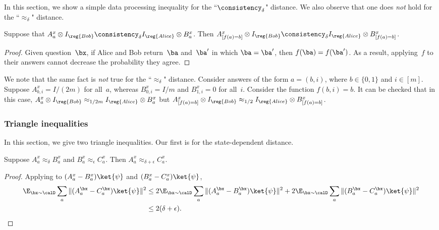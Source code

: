 In this section, we show a simple data processing inequality for the ``$\consistency_\delta$" distance.
We also observe that one does \emph{not} hold for the ``$\approx_\delta$" distance.

\begin{fact}\label{fact:specialize-the-simeq}
Suppose that $A^x_a \otimes I_{\reg{Bob}} \consistency_\delta I_{\reg{Alice}} \otimes B^x_a$.
Then $A^x_{[f(a) = b]} \otimes I_{\reg{Bob}} \consistency_\delta I_{\reg{Alice}} \otimes B^x_{[f(a) = b]}$.
\end{fact}
\begin{proof}
Given question~$\bx$, if Alice and Bob return~$\ba$ and~$\ba'$ in which $\ba = \ba'$, then $f(\ba) = f(\ba')$.
As a result, applying~$f$ to their answers cannot decrease the probability they agree.
\end{proof}

\begin{remark}
We note that the same fact is \emph{not} true for the ``$\approx_\delta$" distance.
Consider answers of the form $a = (b, i)$, where $b \in \{0, 1\}$ and $i \in [m]$.
Suppose $A^x_{b, i} = I/(2m)$ for all~$a$, whereas $B^x_{0, i} = I/m$ and $B^x_{1, i} = 0$ for all~$i$.
Consider the function $f(b, i) = b$.
It can be checked that in this case, $A^x_a \otimes I_{\reg{Bob}} \approx_{1/2m} I_{\reg{Alice}} \otimes B^x_a$
but $A^x_{[f(a) = b]} \otimes I_{\reg{Bob}} \approx_{1/2} I_{\reg{Alice}} \otimes B^x_{[f(a) = b]}$.
\end{remark}

\subsubsection{Triangle inequalities}

In this section, we give two triangle inequalities. Our first is for the state-dependent distance.

\begin{fact}\label{fact:triangle}
Suppose $A_a^x \approx_\delta B_a^x$ and $B_a^x \approx_\epsilon C_a^x$. Then $A_a^x \approx_{\delta + \epsilon} C_a^x$.
\end{fact}
\begin{proof}
Applying  to $(A_{a}^{x} - B_{a}^{x} ) \ket{\psi}$ and $(B_{a}^{x} - C_{a}^{x} ) \ket{\psi}$,
\begin{align*}
\E_{\bx \sim \calD} \sum_a \Vert (A_{a}^{\bx} - C_{a}^{\bx} ) \ket{\psi}\Vert^2
&\leq 2 \E_{\bx \sim \calD} \sum_a \Vert (A_{a}^{\bx} - B_{a}^{\bx} ) \ket{\psi}\Vert^2 + 2 \E_{\bx \sim \calD} \sum_a \Vert (B_{a}^{\bx} - C_{a}^{\bx} ) \ket{\psi}\Vert^2\\
&\leq 2 (\delta + \epsilon).\qedhere
\end{align*}
\end{proof}


